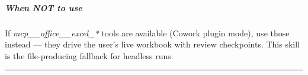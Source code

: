 \documentclass[11pt]{article}
\begin{document}
\subparagraph{When NOT to use}\mbox{}\par

If \emph{mcp\_\allowbreak{}\_\allowbreak{}office\_\allowbreak{}\_\allowbreak{}excel\_\allowbreak{}*} tools are available (Cowork plugin mode), use those instead — they drive the user's live workbook with review checkpoints. This skill is the file-producing fallback for headless runs.


\vspace{0.8em}\hrule\vspace{0.8em}
\end{document}
